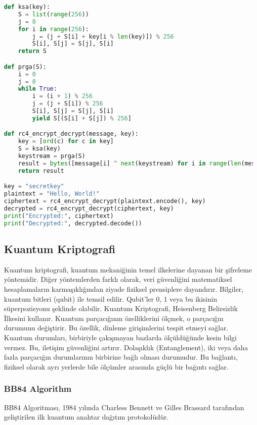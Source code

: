 \begin{lstlisting}[language=Python]
def ksa(key):
    S = list(range(256))
    j = 0
    for i in range(256):
        j = (j + S[i] + key[i % len(key)]) % 256
        S[i], S[j] = S[j], S[i]
    return S

def prga(S):
    i = 0
    j = 0
    while True:
        i = (i + 1) % 256
        j = (j + S[i]) % 256
        S[i], S[j] = S[j], S[i]
        yield S[(S[i] + S[j]) % 256]

def rc4_encrypt_decrypt(message, key):
    key = [ord(c) for c in key]
    S = ksa(key)
    keystream = prga(S)
    result = bytes([message[i] ^ next(keystream) for i in range(len(message))])
    return result

key = "secretkey"
plaintext = "Hello, World!"
ciphertext = rc4_encrypt_decrypt(plaintext.encode(), key)
decrypted = rc4_encrypt_decrypt(ciphertext, key)
print("Encrypted:", ciphertext)
print("Decrypted:", decrypted.decode())
\end{lstlisting}

\newpage

\subsection{Kuantum Kriptografi}

Kuantum kriptografi, kuantum mekaniğinin temel ilkelerine dayanan bir şifreleme yöntemidir. Diğer yöntemlerden farklı olarak, veri güvenliğini matematiksel hesaplamaların karmaşıklığından ziyade fiziksel prensiplere dayandırır. Bilgiler, kuantum bitleri (qubit) ile temsil edilir. Qubit'ler 0, 1 veya bu ikisinin süperpozisyonu şeklinde olabilir. Kuantum Kriptografi, Heisenberg Belirsizlik İlkesini kullanır. Kuantum parçacığının özelliklerini ölçmek, o parçacığın durumunu değiştirir. Bu özellik, dinleme girişimlerini tespit etmeyi sağlar. Kuantum durumları, birbiriyle çakışmayan bazlarda ölçüldüğünde kesin bilgi vermez. Bu, iletişim güvenliğini artırır. Dolaşıklık (Entanglement), iki veya daha fazla parçacığın durumlarının birbirine bağlı olması durumudur. Bu bağlantı, fiziksel olarak ayrı yerlerde bile ölçümler arasında güçlü bir bağıntı sağlar.

\subsubsection{BB84 Algorithm}

BB84 Algoritması, 1984 yılında Charless Bennett ve Gilles Brassard tarafından geliştirilen ilk kuantum anahtar dağıtım protokolüdür. 

